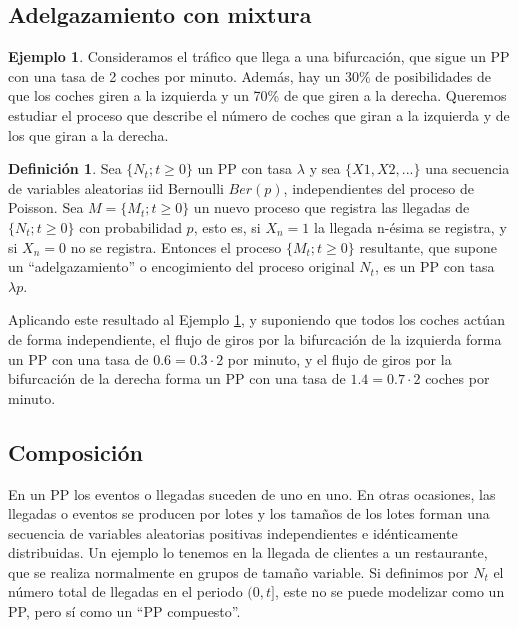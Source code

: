 \documentclass[
]{book}
\newenvironment{yellowbox}{
  \definecolor{shadecolor}{rgb}{210, 180, 140}  
  \color{black}
  \begin{shaded}}
 {\end{shaded}}
\theoremstyle{definition}
\newtheorem{definition}{Definición}[chapter]
\theoremstyle{definition}
\newtheorem{example}{Ejemplo}[chapter]
\theoremstyle{definition}
\theoremstyle{definition}
\theoremstyle{remark}
\begin{document}
\hypertarget{adelgazamiento_pp}{%
\subsection{Adelgazamiento con mixtura}\label{adelgazamiento_pp}}

\begin{example}
\protect\hypertarget{exm:pp003}{}\label{exm:pp003}Consideramos el tráfico que llega a una bifurcación, que sigue un PP con una tasa de 2 coches por minuto. Además, hay un 30\% de posibilidades de que los coches giren a la izquierda y un 70\% de que giren a la derecha. Queremos estudiar el proceso que describe el número de coches que giran a la izquierda y de los que giran a la derecha.
\end{example}

\begin{yellowbox}

\begin{definition}
Sea \(\{N_t; t \geq 0\}\) un PP con tasa \(\lambda\) y sea \(\{X1,X2,...\}\) una secuencia de variables aleatorias iid Bernoulli \(Ber(p)\), independientes del proceso de Poisson. Sea \(M = \{M_t ;t \geq 0 \}\) un nuevo proceso que registra las llegadas de \(\{N_t; t \geq 0\}\) con probabilidad \(p\), esto es, si \(X_n=1\) la llegada n-ésima se registra, y si \(X_n=0\) no se registra. Entonces el proceso \(\{M_t; t \geq 0\}\) resultante, que supone un ``adelgazamiento'' o encogimiento del proceso original \(N_t\), es un PP con tasa \(\lambda p\).
\end{definition}

\end{yellowbox}

Aplicando este resultado al Ejemplo \ref{exm:pp003}, y suponiendo que todos los coches actúan de forma independiente, el flujo de giros por la bifurcación de la izquierda forma un PP con una tasa de \(0.6=0.3\cdot 2\) por minuto, y el flujo de giros por la bifurcación de la derecha forma un PP con una tasa de \(1.4=0.7\cdot 2\) coches por minuto.

\hypertarget{composicion_pp}{%
\subsection{Composición}\label{composicion_pp}}

En un PP los eventos o llegadas suceden de uno en uno. En otras ocasiones, las llegadas o eventos se producen por lotes y los tamaños de los lotes forman una secuencia de variables aleatorias positivas independientes e idénticamente distribuidas. Un ejemplo lo tenemos en la llegada de clientes a un restaurante, que se realiza normalmente en grupos de tamaño variable. Si definimos por \(N_t\) el número total de llegadas en el periodo \((0,t]\), este no se puede modelizar como un PP, pero sí como un ``PP compuesto''.
\end{document}
